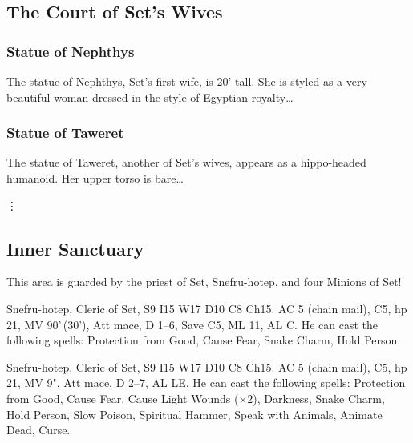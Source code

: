 \documentclass[a4paper,serif]{module}
\begin{document}
\lipsum[7-8]

\subsection{The Court of Set's Wives} %

\lipsum[9]

\subsubsection{Statue of Nephthys} %
\label{west_court}

The statue of Nephthys, Set's first wife, is 20' tall. She is styled as a very beautiful woman dressed in the
style of Egyptian royalty\ldots

\subsubsection{Statue of Taweret} %

The statue of Taweret, another of Set's wives, appears as a hippo-headed humanoid. Her upper torso is bare\ldots

\vdots

\setcounter{subsection}{13} %

\subsection{Inner Sanctuary} %
\label{inner_sanctuary}

This area is guarded by the priest of Set, Snefru-hotep, and four Minions of Set!
\begin{statblockfreestyle}
\begin{ifbasicstats}
Snefru-hotep, Cleric of Set, S9 I15 W17 D10 C8 Ch15. AC 5 (chain mail), C5, hp 21, MV 90'\,(30'), Att mace, D 1--6, Save C5, ML 11, AL C.
He can cast the following spells: Protection from Good, Cause Fear, Snake Charm, Hold Person.
\end{ifbasicstats}
\begin{ifadvancedstats}
Snefru-hotep, Cleric of Set, S9 I15 W17 D10 C8 Ch15. AC 5 (chain mail), C5, hp 21, MV 9", Att mace, D 2--7, AL LE.
He can cast the following spells: Protection from Good, Cause Fear, Cause Light Wounds ($\times 2$), Darkness,
Snake Charm, Hold Person, Slow Poison, Spiritual Hammer, Speak with Animals, Animate Dead, Curse.
\end{ifadvancedstats}
\end{statblockfreestyle}
\lipsum[10-11]
\end{document}
